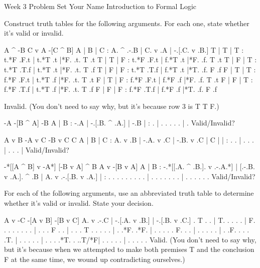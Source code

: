 

\heading
Week 3 Problem Set
Your Name
Introduction to Formal Logic
\endheading

Construct truth tables for the following arguments. For each one, state whether it's valid or invalid.

\problems
{}
\argument
 A ^ -B
 C v A
\argumentline
 -[C ^ B]
\endargument
	\answer
	\truthtable
	 A | B | C : A. ^ .-.B | C. v .A | -.[.C. v .B.]
	\truthtableline
	 T | T | T : t.*F .F.t | t.*T .t |*F. .t. T .t
	 T | T | F : t.*F .F.t | f.*T .t |*F. .f. T .t
	 T | F | T : t.*T .T.f | t.*T .t |*F. .t. T .f
	 T | F | F : t.*T .T.f | f.*T .t |*T. .f. F .f
	 F | T | T : f.*F .F.t | t.*T .f |*F. .t. T .t
	 F | T | F : f.*F .F.t | f.*F .f |*F. .f. T .t
	 F | F | T : f.*F .T.f | t.*T .f |*F. .t. T .f
	 F | F | F : f.*F .T.f | f.*F .f |*T. .f. F .f
	\endtruthtable

	Invalid. (You don't need to say why, but it's because row 3 is T T F.)
	\endanswer

\argument
 -A
 -[B ^ A]
\argumentline
 -B
\endargument
	\answer
	\truthtable
	 A | B : -.A | -.[.B. ^ .A.] | -.B
	\truthtableline
	   |   :  .  |  . . .   . .  |  . 
	\endtruthtable
	Valid/Invalid?
	\endanswer

\argument
 A v B
 -A v C
 -B v C
\argumentline
 C
\endargument
	\answer
	\truthtable
	 A | B | C : A. v .B | -.A. v .C | -.B. v .C | C
	\truthtableline
	   |   |   :  .   .  |  . .   .  |  . .   .  |  
	\endtruthtable
	Valid/Invalid?
	\endanswer

\argument
 -*[[A ^ B] v -A*]
 [-B v A] ^ B
\argumentline
 A v -[B v A]
\endargument
	\answer
	\truthtable
	 A | B : -.*[[.A. ^ .B.]. v .-.A.*] | [.-.B. v .A.]. ^ .B | A. v .-.[.B. v .A.]
	\truthtableline
	   |   :  .   . .   . . .   . . .   |  . . .   . . .   .  |  .   . . . .   . 
	\endtruthtable
	Valid/Invalid?
	\endanswer
\endproblems

For each of the following arguments, use an abbreviated truth table to determine whether it's valid or invalid. State your decision.

\problems
{}
\argument
 A v -C
 -[A v B]
\argumentline
 -[B v C]
\endargument
	\answer
	\truthtable
	 A. v .-.C | -.[.A. v .B.] | -.[.B. v .C.]
	\truthtableline
	  . T . .  | T. . .   . .  | F. . .   . .
	  .   . .  |  . . . F . .  |  . . . T . .
	  .   . .  |  . .*F.  .*F. |  . . .   . .
	 F.   . .  |  . . .   . .  |  . .F.   . .
	  .   .T.  |  . . .   . .  |  . . .   .*T.
	  .  ..T/*F|  . . .   . .  |  . . .   . .
	\endtruthtable
	Valid. (You don't need to say why, but it's because when we attempted to make both premises T and the conclusion F at the same time, we wound up contradicting ourselves.)
	\endanswer

